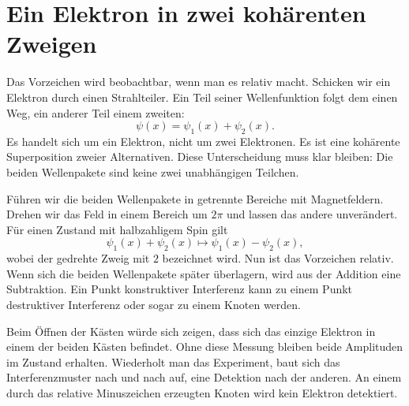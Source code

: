 \begin{classroomqa}
\end{classroomqa}

\section{Ein Elektron in zwei kohärenten Zweigen}

Das Vorzeichen wird beobachtbar, wenn man es relativ macht. Schicken wir ein Elektron durch einen Strahlteiler. Ein Teil seiner Wellenfunktion folgt dem einen Weg, ein anderer Teil einem zweiten:
\begin{equation}
\psi(x)=\psi_1(x)+\psi_2(x).
\end{equation}
Es handelt sich um ein Elektron, nicht um zwei Elektronen. Es ist eine kohärente Superposition zweier Alternativen. Diese Unterscheidung muss klar bleiben: Die beiden Wellenpakete sind keine zwei unabhängigen Teilchen.

Führen wir die beiden Wellenpakete in getrennte Bereiche mit Magnetfeldern. Drehen wir das Feld in einem Bereich um \(2\pi\) und lassen das andere unverändert. Für einen Zustand mit halbzahligem Spin gilt
\begin{equation}
\psi_1(x)+\psi_2(x)
\longmapsto
\psi_1(x)-\psi_2(x),
\end{equation}
wobei der gedrehte Zweig mit \(2\) bezeichnet wird. Nun ist das Vorzeichen relativ. Wenn sich die beiden Wellenpakete später überlagern, wird aus der Addition eine Subtraktion. Ein Punkt konstruktiver Interferenz kann zu einem Punkt destruktiver Interferenz oder sogar zu einem Knoten werden.

\begin{classroomqa}
\end{classroomqa}

Beim Öffnen der Kästen würde sich zeigen, dass sich das einzige Elektron in einem der beiden Kästen befindet. Ohne diese Messung bleiben beide Amplituden im Zustand erhalten. Wiederholt man das Experiment, baut sich das Interferenzmuster nach und nach auf, eine Detektion nach der anderen. An einem durch das relative Minuszeichen erzeugten Knoten wird kein Elektron detektiert.

